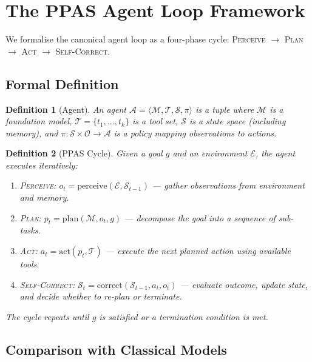 \documentclass[12pt, a4paper]{article}
\newtheorem{definition}{Definition}
\begin{document}
\section{The PPAS Agent Loop Framework}\label{sec:framework}

We formalise the canonical agent loop as a four-phase cycle: \textsc{Perceive $\rightarrow$ Plan $\rightarrow$ Act $\rightarrow$ Self-Correct}.

\subsection{Formal Definition}

\begin{definition}[Agent]
An agent $\mathcal{A} = \langle \mathcal{M}, \mathcal{T}, \mathcal{S}, \pi \rangle$ is a tuple where $\mathcal{M}$ is a foundation model, $\mathcal{T} = \{t_1, \ldots, t_k\}$ is a tool set, $\mathcal{S}$ is a state space (including memory), and $\pi: \mathcal{S} \times \mathcal{O} \rightarrow \mathcal{A}$ is a policy mapping observations to actions.
\end{definition}

\begin{definition}[PPAS Cycle]
Given a goal $g$ and an environment $\mathcal{E}$, the agent executes iteratively:
\begin{enumerate}
    \item \textsc{Perceive}: $o_t = \text{perceive}(\mathcal{E}, \mathcal{S}_{t-1})$ --- gather observations from environment and memory.
    \item \textsc{Plan}: $p_t = \text{plan}(\mathcal{M}, o_t, g)$ --- decompose the goal into a sequence of sub-tasks.
    \item \textsc{Act}: $a_t = \text{act}(p_t, \mathcal{T})$ --- execute the next planned action using available tools.
    \item \textsc{Self-Correct}: $\mathcal{S}_t = \text{correct}(\mathcal{S}_{t-1}, a_t, o_t)$ --- evaluate outcome, update state, and decide whether to re-plan or terminate.
\end{enumerate}
The cycle repeats until $g$ is satisfied or a termination condition is met.
\end{definition}

\subsection{Comparison with Classical Models}
\end{document}
